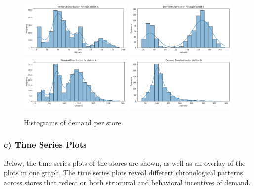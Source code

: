\begin{figure}[H]
    \centering
    \includegraphics[width=0.49\textwidth]{figures/histogram_main_street_A.png}
    \includegraphics[width=0.49\textwidth]{figures/histogram_main_street_B.png}
    \includegraphics[width=0.49\textwidth]{figures/histogram_station_A.png}
    \includegraphics[width=0.49\textwidth]{figures/histogram_station_B.png}
    \caption{Histograms of demand per store.}
    \label{fig:histograms}
\end{figure}

\subsubsection*{c) Time Series Plots}
Below, the time-series plots of the stores are shown, as well as an overlay of the plots in one graph. The time series plots reveal different chronological patterns across stores that reflect on both structural and behavioral incentives of demand. 


